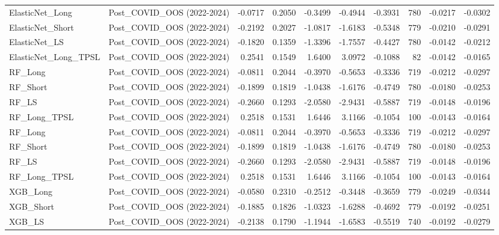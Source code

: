 \begin{tabular}{llrrrrrrrr}
\cline{1-10}
ElasticNet\_Long & Post\_COVID\_OOS (2022-2024) & -0.0717 & 0.2050 & -0.3499 & -0.4944 & -0.3931 & 780 & -0.0217 & -0.0302 \\
\cline{1-10}
ElasticNet\_Short & Post\_COVID\_OOS (2022-2024) & -0.2192 & 0.2027 & -1.0817 & -1.6183 & -0.5348 & 779 & -0.0210 & -0.0291 \\
\cline{1-10}
ElasticNet\_LS & Post\_COVID\_OOS (2022-2024) & -0.1820 & 0.1359 & -1.3396 & -1.7557 & -0.4427 & 780 & -0.0142 & -0.0212 \\
\cline{1-10}
ElasticNet\_Long\_TPSL & Post\_COVID\_OOS (2022-2024) & 0.2541 & 0.1549 & 1.6400 & 3.0972 & -0.1088 & 82 & -0.0142 & -0.0165 \\
\cline{1-10}
RF\_Long & Post\_COVID\_OOS (2022-2024) & -0.0811 & 0.2044 & -0.3970 & -0.5653 & -0.3336 & 719 & -0.0212 & -0.0297 \\
\cline{1-10}
RF\_Short & Post\_COVID\_OOS (2022-2024) & -0.1899 & 0.1819 & -1.0438 & -1.6176 & -0.4749 & 780 & -0.0180 & -0.0253 \\
\cline{1-10}
RF\_LS & Post\_COVID\_OOS (2022-2024) & -0.2660 & 0.1293 & -2.0580 & -2.9431 & -0.5887 & 719 & -0.0148 & -0.0196 \\
\cline{1-10}
RF\_Long\_TPSL & Post\_COVID\_OOS (2022-2024) & 0.2518 & 0.1531 & 1.6446 & 3.1166 & -0.1054 & 100 & -0.0143 & -0.0164 \\
\cline{1-10}
RF\_Long & Post\_COVID\_OOS (2022-2024) & -0.0811 & 0.2044 & -0.3970 & -0.5653 & -0.3336 & 719 & -0.0212 & -0.0297 \\
\cline{1-10}
RF\_Short & Post\_COVID\_OOS (2022-2024) & -0.1899 & 0.1819 & -1.0438 & -1.6176 & -0.4749 & 780 & -0.0180 & -0.0253 \\
\cline{1-10}
RF\_LS & Post\_COVID\_OOS (2022-2024) & -0.2660 & 0.1293 & -2.0580 & -2.9431 & -0.5887 & 719 & -0.0148 & -0.0196 \\
\cline{1-10}
RF\_Long\_TPSL & Post\_COVID\_OOS (2022-2024) & 0.2518 & 0.1531 & 1.6446 & 3.1166 & -0.1054 & 100 & -0.0143 & -0.0164 \\
\cline{1-10}
XGB\_Long & Post\_COVID\_OOS (2022-2024) & -0.0580 & 0.2310 & -0.2512 & -0.3448 & -0.3659 & 779 & -0.0249 & -0.0344 \\
\cline{1-10}
XGB\_Short & Post\_COVID\_OOS (2022-2024) & -0.1885 & 0.1826 & -1.0323 & -1.6288 & -0.4692 & 779 & -0.0192 & -0.0251 \\
\cline{1-10}
XGB\_LS & Post\_COVID\_OOS (2022-2024) & -0.2138 & 0.1790 & -1.1944 & -1.6583 & -0.5519 & 740 & -0.0192 & -0.0279 \\

\end{tabular}
